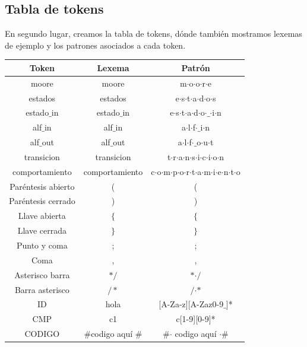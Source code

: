 \documentclass[12pt,a4paper]{article}
\begin{document}
\subsection{Tabla de tokens}
En segundo lugar, creamos la tabla de tokens, dónde también mostramos lexemas de ejemplo y los patrones asociados a cada token.
\begin{center}
		\begin{tabular}{|c|c|c|}
			\hline 
			\textbf{Token} & \textbf{Lexema} & \textbf{Patrón} \\ 
			\hline 
			moore & moore & m$\cdot$o$\cdot$o$\cdot$r$\cdot$e  \\ 
			\hline 
			estados &estados & e$\cdot$s$\cdot$t$\cdot$a$\cdot$d$\cdot$o$\cdot$s \\ 
			\hline 
			estado$\_$in & estado$\_$in & e$\cdot$s$\cdot$t$\cdot$a$\cdot$d$\cdot$o$\cdot$$\_$$\cdot$i$\cdot$n \\ 
			\hline 
			alf$\_$in	& alf$\_$in & a$\cdot$l$\cdot$f$\cdot$$\_$i$\cdot$n \\ 
			\hline 
				alf$\_$out	& alf$\_$out & a$\cdot$l$\cdot$f$\cdot$$\_$o$\cdot$u$\cdot$t \\ 
			\hline 
				transicion	& transicion & t$\cdot$r$\cdot$a$\cdot$n$\cdot$s$\cdot$i$\cdot$c$\cdot$i$\cdot$o$\cdot$n \\ 
			\hline 
				comportamiento	& comportamiento & c$\cdot$o$\cdot$m$\cdot$p$\cdot$o$\cdot$r$\cdot$t$\cdot$a$\cdot$m$\cdot$i$\cdot$e$\cdot$n$\cdot$t$\cdot$o \\ 
			\hline 
			Paréntesis abierto	& ( & ( \\ 
			\hline 
			Paréntesis cerrado	& ) & ) \\ 
			\hline 
			Llave abierta	& $\{$ & $\{$ \\ 
			\hline 
			Llave cerrada	& $\}$ & $\}$ \\ 
			\hline 
			Punto y coma	& ; & ; \\ 
			\hline 
			Coma	& , &  , \\ 
			\hline
			Asterisco barra & $\ast/$  & $\ast$$\cdot/$ \\ 
			\hline 
			Barra asterisco & $/\ast$  &  $/$$\cdot$$\ast$ \\ 
			\hline  
			ID	& hola  & [A-Za-z][A-Zaz0-9$\_$]* \\ 
			\hline 
			CMP	& c1 & c[1-9][0-9]* \\ 
			\hline
		    CODIGO	& $\#$codigo aquí $\#$  & $\#$$\cdot$ codigo aquí $\cdot$$\#$\\ 
			\hline
		\end{tabular} 	
	\end{center}
\clearpage
\end{document}

